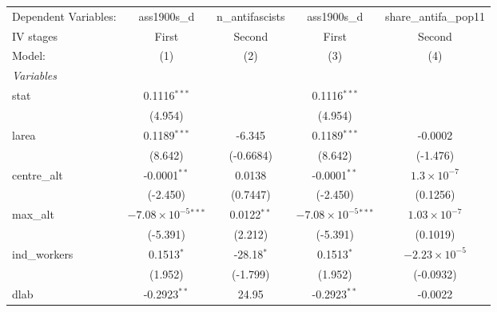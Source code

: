 
\begingroup
\centering
\begin{tabular}{lcccc}
   \tabularnewline \midrule \midrule
   Dependent Variables:             & ass1900s\_d                    & n\_antifascists  & ass1900s\_d                    & share\_antifa\_pop11\\    
   IV stages                        & First                          & Second           & First                          & Second \\   
   Model:                           & (1)                            & (2)              & (3)                            & (4)\\  
   \midrule
   \emph{Variables}\\
   stat                             & 0.1116$^{***}$                 &                  & 0.1116$^{***}$                 &   \\   
                                    & (4.954)                        &                  & (4.954)                        &   \\   
   larea                            & 0.1189$^{***}$                 & -6.345           & 0.1189$^{***}$                 & -0.0002\\   
                                    & (8.642)                        & (-0.6684)        & (8.642)                        & (-1.476)\\   
   centre\_alt                      & -0.0001$^{**}$                 & 0.0138           & -0.0001$^{**}$                 & $1.3\times 10^{-7}$\\    
                                    & (-2.450)                       & (0.7447)         & (-2.450)                       & (0.1256)\\   
   max\_alt                         & $-7.08\times 10^{-5}$$^{***}$  & 0.0122$^{**}$    & $-7.08\times 10^{-5}$$^{***}$  & $1.03\times 10^{-7}$\\    
                                    & (-5.391)                       & (2.212)          & (-5.391)                       & (0.1019)\\   
   ind\_workers                     & 0.1513$^{*}$                   & -28.18$^{*}$     & 0.1513$^{*}$                   & $-2.23\times 10^{-5}$\\    
                                    & (1.952)                        & (-1.799)         & (1.952)                        & (-0.0932)\\   
   dlab                             & -0.2923$^{**}$                 & 24.95            & -0.2923$^{**}$                 & -0.0022\\   

\end{tabular}
